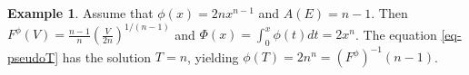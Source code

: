 \documentclass[12pt]{amsart}
\theoremstyle{definition}
\newtheorem{ex}[thm]{Example}
\def\bl{{\rm Bl}}
\newcommand{\IP}{{\mathbb P}}
\newcommand{\IZ}{{\mathbb Z}}
\newcommand{\CO}{{\mathcal O}}
\begin{document}
\begin{ex}\label{ex-2nn}
   Assume that $\phi(x)=2n x^{n-1}$ and $A(E)=n-1$. Then  
   $F^\phi(V)=\frac{n-1}{n}\left(\frac{V}{2n}\right)^{1/(n-1)}$ and  $\Phi(x)=\int_0^x\phi(t)dt=2x^n$. The equation \eqref{eq-pseudoT} has the solution $T=n$, yielding $\phi(T)=2n^n=(F^\phi)^{-1}(n-1)$. 
\end{ex}

\end{document}
